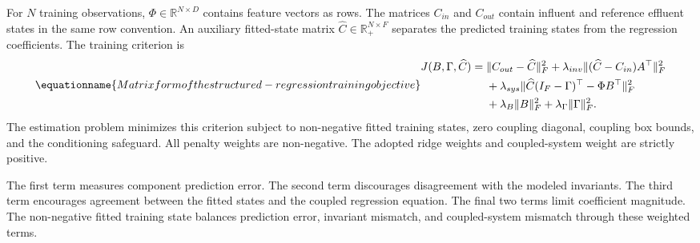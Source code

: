 For \(N\) training observations, \(\Phi\in\mathbb{R}^{N\times D}\) contains feature vectors as rows. The matrices \(C_{in}\) and \(C_{out}\) contain influent and reference effluent states in the same row convention. An auxiliary fitted-state matrix \(\widehat C\in\mathbb{R}_{+}^{N\times F}\) separates the predicted training states from the regression coefficients. The training criterion is
\begin{equation}
\equationname{Matrix form of the structured-regression training objective}
\label{eq:icsor_training_objective}
\begin{aligned}
J(B,\Gamma,\widehat C)={}&
\|C_{out}-\widehat C\|_F^2
+\lambda_{inv}\| (\widehat C-C_{in})A^\top\|_F^2\\
&+\lambda_{sys}\|\widehat C(I_F-\Gamma)^\top-\Phi B^\top\|_F^2\\
&+\lambda_B\|B\|_F^2+\lambda_{\Gamma}\|\Gamma\|_F^2.
\end{aligned}
\end{equation}
The estimation problem minimizes this criterion subject to non-negative fitted training states, zero coupling diagonal, coupling box bounds, and the conditioning safeguard. All penalty weights are non-negative. The adopted ridge weights and coupled-system weight are strictly positive.

The first term measures component prediction error. The second term discourages disagreement with the modeled invariants. The third term encourages agreement between the fitted states and the coupled regression equation. The final two terms limit coefficient magnitude. The non-negative fitted training state balances prediction error, invariant mismatch, and coupled-system mismatch through these weighted terms.

